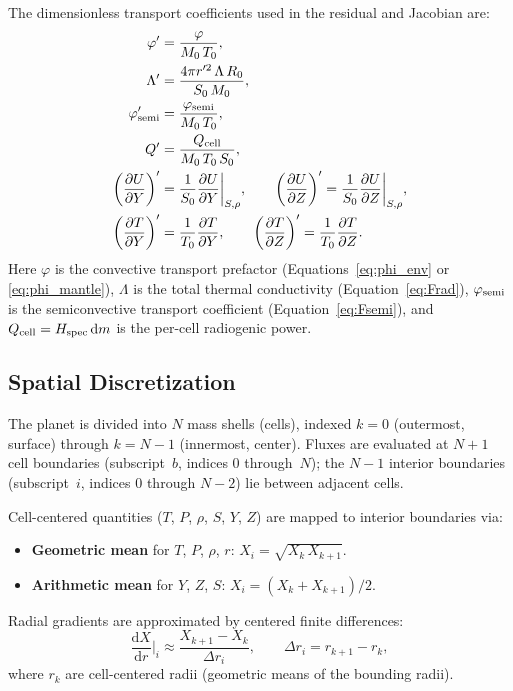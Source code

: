 \documentclass{aastex631}
\newcommand{\dd}{\mathrm{d}}
\newcommand{\pp}{\partial}
\begin{document}
The dimensionless transport coefficients used in the residual and
Jacobian are:
\begin{align}
  \varphi'  &= \frac{\varphi}{M_0\,T_0},
  \label{eq:phi_prime}\\
  \Lambda'  &= \frac{4\pi r'^2\,\Lambda\,R_0}{S_0\,M_0},
  \label{eq:Lambda_prime}\\
  \varphi'_{\rm semi}
            &= \frac{\varphi_{\rm semi}}{M_0\,T_0},
  \label{eq:semi_phi_prime}\\
  Q'        &= \frac{Q_{\rm cell}}{M_0\,T_0\,S_0},
  \label{eq:Q_prime}\\
  \left(\frac{\pp U}{\pp Y}\right)'
            &= \frac{1}{S_0}\frac{\pp U}{\pp Y}\bigg|_{S,\rho},
  \qquad
  \left(\frac{\pp U}{\pp Z}\right)'
            = \frac{1}{S_0}\frac{\pp U}{\pp Z}\bigg|_{S,\rho},
  \label{eq:dUdYZ_prime}\\
  \left(\frac{\pp T}{\pp Y}\right)'
            &= \frac{1}{T_0}\frac{\pp T}{\pp Y},
  \qquad
  \left(\frac{\pp T}{\pp Z}\right)'
            = \frac{1}{T_0}\frac{\pp T}{\pp Z}.
  \label{eq:dTdYZ_prime}
\end{align}
Here $\varphi$ is the convective transport prefactor
(Equations~\ref{eq:phi_env} or \ref{eq:phi_mantle}), $\Lambda$ is the
total thermal conductivity (Equation~\ref{eq:Frad}), $\varphi_{\rm semi}$
is the semiconvective transport coefficient
(Equation~\ref{eq:Fsemi}), and $Q_{\rm cell} = H_{\rm spec}\,\dd m$
is the per-cell radiogenic power.

\subsection{Spatial Discretization}\label{sec:grid}

The planet is divided into $N$ mass shells (cells), indexed
$k=0$ (outermost, surface) through $k=N-1$ (innermost, center).
Fluxes are evaluated at $N+1$ cell boundaries (subscript~$b$, indices
$0$ through~$N$); the $N-1$ interior boundaries (subscript~$i$,
indices $0$ through $N-2$) lie between adjacent cells.

Cell-centered quantities ($T$, $P$, $\rho$, $S$, $Y$, $Z$) are
mapped to interior boundaries via:
\begin{itemize}
  \item \textbf{Geometric mean} for $T$, $P$, $\rho$, $r$:
    \;$X_i = \sqrt{X_k\,X_{k+1}}$.
  \item \textbf{Arithmetic mean} for $Y$, $Z$, $S$:
    \;$X_i = (X_k + X_{k+1})/2$.
\end{itemize}
Radial gradients are approximated by centered finite differences:
\begin{equation}\label{eq:fd_grad}
  \frac{\dd X}{\dd r}\bigg|_i
  \approx \frac{X_{k+1} - X_k}{\Delta r_i},
  \qquad
  \Delta r_i = r_{k+1} - r_k,
\end{equation}
where $r_k$ are cell-centered radii (geometric means of the bounding
radii).
\end{document}
